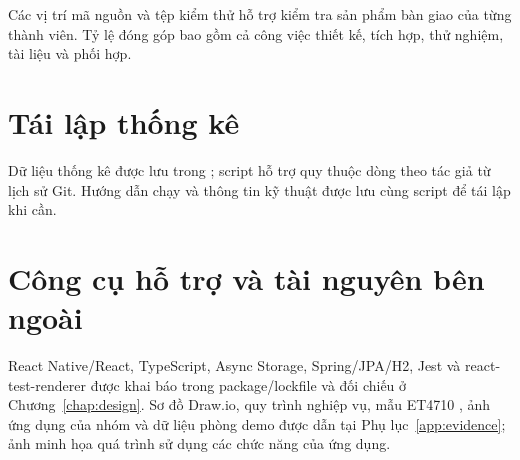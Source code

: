 Các vị trí mã nguồn và tệp kiểm thử hỗ trợ kiểm tra sản phẩm bàn giao của từng thành viên. Tỷ lệ đóng góp bao gồm cả công việc thiết kế, tích hợp, thử nghiệm, tài liệu và phối hợp.

\section{Tái lập thống kê}
Dữ liệu thống kê được lưu trong ; script  hỗ trợ quy thuộc dòng theo tác giả từ lịch sử Git. Hướng dẫn chạy và thông tin kỹ thuật được lưu cùng script để tái lập khi cần.

\section[Công cụ hỗ trợ]{Công cụ hỗ trợ và tài nguyên bên ngoài}
React Native/React, TypeScript, Async Storage, Spring/JPA/H2, Jest và react-test-renderer được khai báo trong package/lockfile và đối chiếu ở Chương~\ref{chap:design}. Sơ đồ Draw.io, quy trình nghiệp vụ, mẫu ET4710 \cite{template4710}, ảnh ứng dụng của nhóm và dữ liệu phòng demo được dẫn tại Phụ lục~\ref{app:evidence}; ảnh minh họa quá trình sử dụng các chức năng của ứng dụng.

